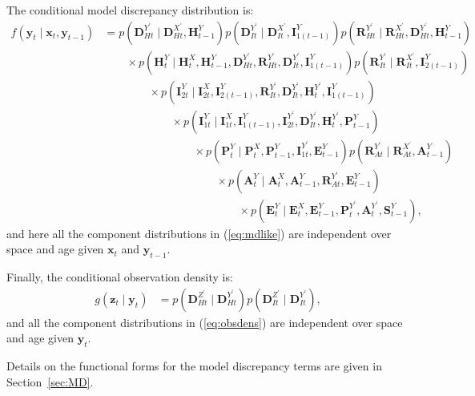 \documentclass[a4paper]{article}
\newcommand{\bx}{\bm{x}}
\newcommand{\by}{\bm{y}}
\newcommand{\bz}{\bm{z}}
\newcommand{\bA}{\bm{A}}
\newcommand{\bD}{\bm{D}}
\newcommand{\bR}{\bm{R}}
\newcommand{\bI}{\bm{I}}
\newcommand{\bP}{\bm{P}}
\newcommand{\bE}{\bm{E}}
\newcommand{\bH}{\bm{H}}
\newcommand{\bS}{\bm{S}}
\begin{document}
The conditional model discrepancy distribution is:
\begin{align}
    f\left(\by_t \mid \bx_t, \by_{t - 1}\right) &= p\left(\bD^{Y^\prime}_{Ht} \mid \bD^{X^\prime}_{Ht}, \bH^{Y}_{t - 1}\right)p\left(\bD^{Y^\prime}_{It} \mid \bD^{X^\prime}_{It}, \bI^{Y}_{1(t - 1)}\right)p\left(\bR^{Y^\prime}_{Ht} \mid \bR^{X^\prime}_{Ht}, \bD^{Y^\prime}_{Ht}, \bH^{Y}_{t - 1}\right)\nonumber\\
    & \qquad \times p\left(\bH^Y_t \mid \bH^X_t, \bH^{Y}_{t - 1}, \bD^{Y^\prime}_{Ht}, \bR^{Y^\prime}_{Ht}, \bD^{Y^\prime}_{It}, \bI^{Y}_{1(t - 1)}\right) p\left(\bR^{Y^\prime}_{It} \mid \bR^{X^\prime}_{It}, \bI^{Y}_{2(t - 1)}\right)\nonumber\\
    &\qquad \qquad \times p\left(\bI^Y_{2t} \mid \bI^X_{2t}, \bI^{Y}_{2(t - 1)}, \bR^{Y^\prime}_{It}, \bD^{Y^\prime}_{It}, \bH^{Y^\prime}_t, \bI^{Y}_{1(t - 1)}\right)\nonumber\\
    &\qquad \qquad \qquad \times p\left(\bI^Y_{1t} \mid \bI^X_{1t}, \bI^{Y}_{1(t - 1)}, \bI^{Y^\prime}_{2t}, \bD^{Y^\prime}_{It}, \bH^{Y^\prime}_t, \bP^{Y}_{t - 1}\right)\nonumber\\
    &\qquad \qquad \qquad \qquad \times p\left(\bP^Y_t \mid \bP^X_t, \bP^{Y}_{t - 1}, \bI^{Y^\prime}_{1t}, \bE^{Y}_{t - 1}\right)p\left(\bR^{Y^\prime}_{At} \mid \bR^{X^\prime}_{At}, \bA^{Y}_{t - 1}\right)\nonumber\\
    & \qquad \qquad \qquad \qquad \qquad \times p\left(\bA^Y_t \mid \bA^X_t, \bA^{Y}_{t - 1}, \bR^{Y^\prime}_{At}, \bE^{Y}_{t - 1}\right)\nonumber\\
    & \qquad \qquad \qquad \qquad \qquad \qquad \times p\left(\bE^Y_t \mid \bE^X_t, \bE^{Y}_{t - 1}, \bP^{Y^\prime}_t, \bA^{Y^\prime}_t, \bS^{Y}_{t - 1}\right),\label{eq:mdlike}
\end{align}
and here all the component distributions in (\ref{eq:mdlike}) are independent over space and age given  $\bx_t$ and $\by_{t - 1}$.

Finally, the conditional observation density is:
\begin{align}
    g\left(\bz_t \mid \by_t\right) &= p\left(\bD^{Z^\prime}_{Ht} \mid \bD^{Y^\prime}_{Ht}\right)p\left(\bD^{Z^\prime}_{It} \mid \bD^{Y^\prime}_{It}\right),\label{eq:obsdens}
\end{align}
and all the component distributions in (\ref{eq:obsdens}) are independent over space and age given $\by_t$.

Details on the functional forms for the model discrepancy terms are given in Section~\ref{sec:MD}.
\end{document}
